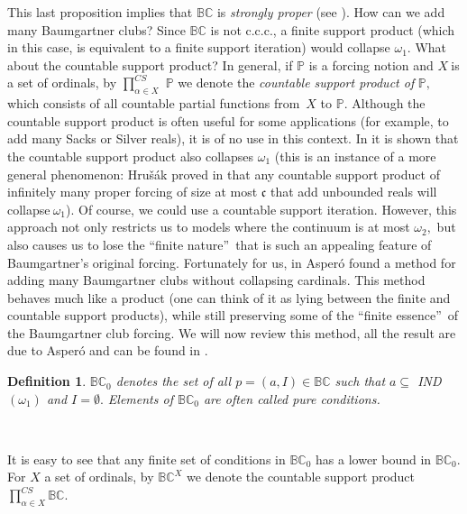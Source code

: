 \documentclass{article}
\newtheorem{definition}[theorem]{Definition}
\begin{document}
This last proposition implies that $\mathbb{BC}$ is \emph{strongly proper
}(see \cite{NotesonForcingAxioms}). How can we add many Baumgartner clubs?
Since $\mathbb{BC}$ is not \textsf{c.c.c.}, a finite support product (which in
this case, is equivalent to a finite support iteration) would collapse
$\omega_{1}.$ What about the countable support product? In general, if
$\mathbb{P}$ is a forcing notion and $X\ $is a set of ordinals, by
$\prod\limits_{\alpha\in X}^{CS}$ $\mathbb{P}$ we denote the \emph{countable
support product of }$\mathbb{P},$ which consists of all countable partial
functions from\ $X$ to $\mathbb{P}$. Although the countable support product is
often useful for some applications (for example, to add many Sacks or Silver
reals), it is of no use in this context. In \cite{AddingBaumgartnerClubs} it
is shown that the countable support product also collapses $\omega_{1}$ (this
is an instance of a more general phenomenon: Hru\v{s}\'{a}k proved in
\cite{Rendezvous} that any countable support product of infinitely many proper
forcing of size at most $\mathfrak{c}$ that add unbounded reals will
collapse$\mathbb{\ }\omega_{1}$). Of course, we could use a countable support
iteration. However, this approach not only restricts us to models where the
continuum is at most $\omega_{2},$ but also causes us to lose the
\textquotedblleft finite nature\textquotedblright\ that is such an appealing
feature of Baumgartner's original forcing. Fortunately for us, in
\cite{AddingBaumgartnerClubs} Asper\'{o} found a method for adding many
Baumgartner clubs without collapsing cardinals. This method behaves much like
a product (one can think of it as lying between the finite and countable
support products), while still preserving some of the \textquotedblleft finite
essence\textquotedblright\ of the Baumgartner club forcing. We will now review
this method, all the result are due to Asper\'{o} and can be found in
\cite{AddingBaumgartnerClubs}.

\begin{definition}
$\mathbb{BC}_{0}$ denotes the set of all $p=\left(  a,I\right)  \in
\mathbb{BC}$ such that $a\subseteq$ \textsf{IND}$\left(  \omega_{1}\right)  $
and $I=\emptyset.$ Elements of $\mathbb{BC}_{0}$ are often called \emph{pure
conditions.}
\end{definition}

\qquad\ \qquad\ \ 

It is easy to see that any finite set of conditions in $\mathbb{BC}_{0}$ has a
lower bound in $\mathbb{BC}_{0}$. For $X$ a set of ordinals, by $\mathbb{BC}%
^{X}$ we denote the countable support product $\prod\limits_{\alpha\in X}%
^{CS}\mathbb{BC}.$
\end{document}
